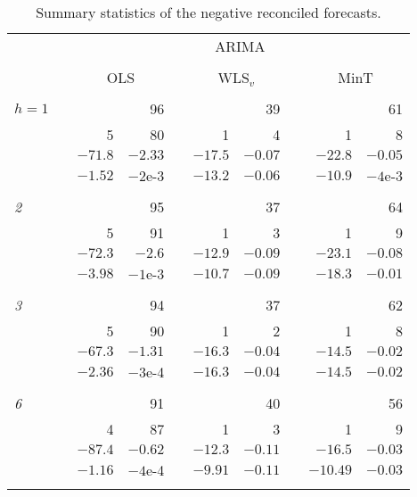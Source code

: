 \documentclass[11pt]{article}
\newcommand{\0}{\phantom{0}}
\begin{document}
\begin{table}[ht]
	\centering
	\fontsize{9}{12}\rm\tabcolsep=0.18cm
	\caption{Summary statistics of the negative reconciled forecasts.}
	\label{tbl:summaryneg}
	\begin{threeparttable}
		\begin{tabular}{lrrrrrrrrr}
			\toprule
			& & \multicolumn{8}{c}{ARIMA}\\
			\cline{3-10}\\[-0.3cm]
			& & \multicolumn{2}{c}{OLS} & & \multicolumn{2}{c}{WLS$_{v}$} & & \multicolumn{2}{c}{MinT} \\ 
			\cline{3-4} \cline{6-7} \cline{9-10} \\[-0.3cm]
			$h = 1$ & & & 96 & & & 39 & & & 61 \\
			& & 5 & 80 & & 1 & 4 & & 1 & 8 \\
			& & $-71.8$ & $-2.33$ & & $-17.5$ & $-0.07$ & & $-22.8$ & $-0.05$ \\
			& & $-1.52$ & $-2$e-3 & & $-13.2$ & $-0.06$ & & $-10.9$ & $-4$e-3 \\ \\[-0.3cm]
			
			{\it 2} & & & 95 & & & 37 & & & 64 \\
			& & 5 & 91 & & 1 & 3 & & 1 & 9 \\
			& & $-72.3$ & $-2.6$ & & $-12.9$ & $-0.09$ & & $-23.1$ & $-0.08$ \\
			& & $-3.98$ & $-1$e-3 & & $-10.7$ & $-0.09$ & & $-18.3$ & $-0.01$ \\ \\[-0.3cm]
			
			{\it 3}	& & & 94 & & & 37 & & & 62 \\	
			& & 5 & 90 & & 1 & 2 & & 1 & 8 \\
			& & $-67.3$ & $-1.31$ & & $-16.3$ & $-0.04$ & & $-14.5$ & $-0.02$ \\ 
			& & $-2.36$ & $-3$e-4 & & $-16.3$ & $-0.04$ & & $-14.5$ & $-0.02$ \\ \\[-0.3cm]
			
			{\it 6} & & & 91 & & & 40 & & & 56 \\
			& & 4 & 87 & & 1 & 3 & & 1 & 9 \\
			& & $-87.4$ & $-0.62$ & & $-12.3$ & $-0.11$ & & $-16.5$ & $-0.03$ \\
			& & $-1.16$ & $-4$e-4 & & $-9.91$ & $-0.11$ & & $-10.49$ & $-0.03$ \\ \\[-0.3cm]
			

\end{tabular}
\end{threeparttable}
\end{table}
\end{document}
